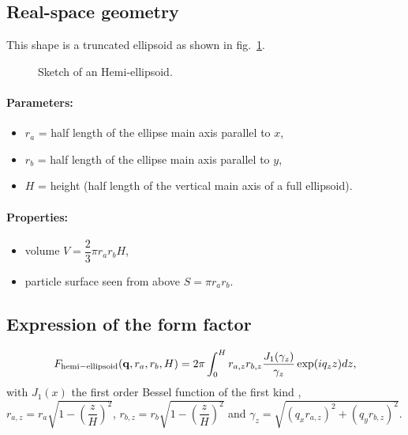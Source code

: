 \subsection{Real-space geometry}
This shape is a truncated ellipsoid as shown in fig.~\ref{hemiellipsoid}.

\begin{figure}[ht]
\begin{center}
\caption{Sketch of an Hemi-ellipsoid.}
\end{center}
\label{hemiellipsoid}
\end{figure}

\paragraph{Parameters:}
\begin{itemize}
\item $r_a$ = half length of the ellipse main axis parallel to $x$,
\item$r_b$ = half length of the ellipse main axis parallel to $y$, 
\item $H$ = height (half length of the vertical main axis of a full ellipsoid).
\end{itemize}

\paragraph{Properties:}
\begin{itemize}
\item volume $V = \dfrac{2}{3}\pi r_a r_bH$,
\item particle surface seen from above $S =\pi r_a r_b$.
\end{itemize}

\subsection{Expression of the form factor}
\begin{equation*}
F_{\rm{hemi-ellipsoid}}(\mathbf{q},r_a,r_b,H) = 2\pi \int_0 ^{H} r_{a,z} r_{b,z}
\frac{J_1(\gamma_z)}{\gamma_z}\exp(iq_z z)dz,
\end{equation*}
with $J_1(x)$ the first order
Bessel function of the first kind \cite{AbSt64}, $r_{a,z} = r_a \sqrt{1-\left(\dfrac{z}{H} \right)^2}$, $r_{b,z} = r_b
\sqrt{1-\left(\dfrac{z}{H} \right)^2}$ and $\gamma_z =\sqrt{(q_x r_{a,z})^2+(q_y r_{b,z})^2}$.


